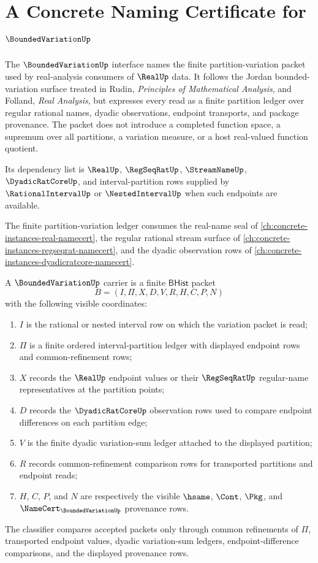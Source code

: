 \chapter{A Concrete Naming Certificate for $\BoundedVariationUp$}
\label{ch:concrete-instances-boundedvariation-namecert}

The $\BoundedVariationUp$ interface names the finite partition-variation packet used by real-analysis consumers of $\RealUp$ data. It follows the Jordan bounded-variation surface treated in Rudin, \emph{Principles of Mathematical Analysis}, and Folland, \emph{Real Analysis}, but expresses every read as a finite partition ledger over regular rational names, dyadic observations, endpoint transports, and package provenance. The packet does not introduce a completed function space, a supremum over all partitions, a variation measure, or a host real-valued function quotient.

Its dependency list is $\RealUp$, $\RegSeqRatUp$, $\StreamNameUp$, $\DyadicRatCoreUp$, and interval-partition rows supplied by $\RationalIntervalUp$ or $\NestedIntervalUp$ when such endpoints are available.

The finite partition-variation ledger consumes the real-name seal of \autoref{ch:concrete-instances-real-namecert}, the regular rational stream surface of \autoref{ch:concrete-instances-regseqrat-namecert}, and the dyadic observation rows of \autoref{ch:concrete-instances-dyadicratcore-namecert}.

\begin{definition}
\label{def:bounded-variation-carrier}
A $\BoundedVariationUp$ carrier is a finite $\mathsf{BHist}$ packet
$$
B=(I,\Pi,X,D,V,R,H,C,P,N)
$$
with the following visible coordinates:
\begin{enumerate}
\item $I$ is the rational or nested interval row on which the variation packet is read;
\item $\Pi$ is a finite ordered interval-partition ledger with displayed endpoint rows and common-refinement rows;
\item $X$ records the $\RealUp$ endpoint values or their $\RegSeqRatUp$ regular-name representatives at the partition points;
\item $D$ records the $\DyadicRatCoreUp$ observation rows used to compare endpoint differences on each partition edge;
\item $V$ is the finite dyadic variation-sum ledger attached to the displayed partition;
\item $R$ records common-refinement comparison rows for transported partitions and endpoint reads;
\item $H$, $C$, $P$, and $N$ are respectively the visible $\hsame$, $\Cont$, $\Pkg$, and $\NameCert_{\BoundedVariationUp}$ provenance rows.
\end{enumerate}
The classifier compares accepted packets only through common refinements of $\Pi$, transported endpoint values, dyadic variation-sum ledgers, endpoint-difference comparisons, and the displayed provenance rows.
\end{definition}

